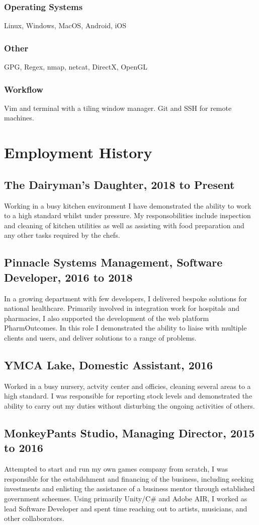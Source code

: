 \documentclass{article}
\begin{document}
\subsubsection{Operating Systems}
Linux, Windows, MacOS, Android, iOS
\subsubsection{Other}
GPG, Regex, nmap, netcat, DirectX, OpenGL
\subsubsection{Workflow}
Vim and terminal with a tiling window manager. Git and SSH for remote machines.

\section{Employment History}
\subsection{The Dairyman's Daughter, 2018 to Present}
Working in a busy kitchen environment I have demonstrated the ability to work to a high standard whilst under pressure.  My responsobilities include inspection and cleaning of kitchen utilities as well as assisting with food preparation and any other tasks required by the chefs.
\subsection{Pinnacle Systems Management, Software Developer, 2016 to 2018}
In a growing department with few developers, I delivered bespoke solutions for national healthcare.  Primarily involved in integration work for hospitals and pharmacies, I also supported the development of the web platform PharmOutcomes.  In this role I demonstrated the ability to liaise with multiple clients and users, and deliver solutions to a range of problems.
\subsection{YMCA Lake, Domestic Assistant, 2016}
Worked in a busy nursery, actvity center and officies, cleaning several areas to a high standard.  I was responsible for reporting stock levels and demonstrated the ability to carry out my duties without disturbing the ongoing activities of others.
\subsection{MonkeyPants Studio, Managing Director, 2015 to 2016}
Attempted to start and run my own games company from scratch, I was responsible for the estabilshment and financing of the business, including seeking investments and enlisting the assistance of a business mentor through established government scheemes.  Using primarily Unity/C\# and Adobe AIR, I worked as lead Software Developer and spent time reaching out to artists, musicians, and other collaborators.
\end{document}
